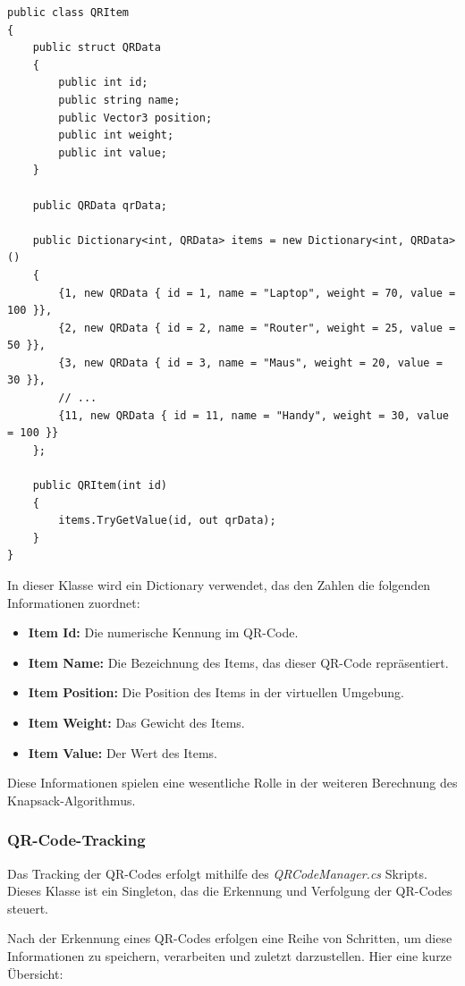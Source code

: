 \begin{lstlisting}[style=csharp, caption={}, label=code:update]
public class QRItem
{
    public struct QRData
    {
        public int id;
        public string name;
        public Vector3 position;
        public int weight;
        public int value;
    }

    public QRData qrData;

    public Dictionary<int, QRData> items = new Dictionary<int, QRData>()
    {
        {1, new QRData { id = 1, name = "Laptop", weight = 70, value = 100 }},
        {2, new QRData { id = 2, name = "Router", weight = 25, value = 50 }},
        {3, new QRData { id = 3, name = "Maus", weight = 20, value = 30 }},
        // ...
        {11, new QRData { id = 11, name = "Handy", weight = 30, value = 100 }}
    };

    public QRItem(int id)
    {
        items.TryGetValue(id, out qrData);
    }
}
\end{lstlisting}

In dieser Klasse wird ein Dictionary verwendet, das den Zahlen die folgenden Informationen zuordnet:

\begin{itemize}
    \item \textbf{Item Id:} Die numerische Kennung im QR-Code.
    \item \textbf{Item Name:} Die Bezeichnung des Items, das dieser QR-Code repräsentiert.
    \item \textbf{Item Position:} Die Position des Items in der virtuellen Umgebung.
    \item \textbf{Item Weight:} Das Gewicht des Items.
    \item \textbf{Item Value:} Der Wert des Items.
\end{itemize}

Diese Informationen spielen eine wesentliche Rolle in der weiteren Berechnung des Knapsack-Algorithmus.

\subsubsection{QR-Code-Tracking}
Das Tracking der QR-Codes erfolgt mithilfe des \textit{QRCodeManager.cs} Skripts. Dieses Klasse ist ein Singleton, das
die Erkennung und Verfolgung der QR-Codes steuert.

Nach der Erkennung eines QR-Codes erfolgen eine Reihe von Schritten, um diese Informationen zu speichern, verarbeiten
und zuletzt darzustellen.
Hier eine kurze Übersicht:

